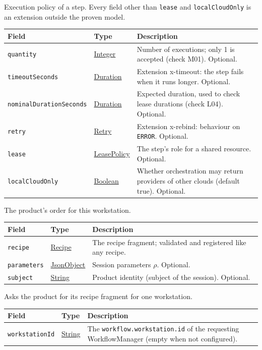 \documentclass[a4paper]{arrowhead}
\newcommand{\mref}[1]{{\textcolor{ArrowheadPurple}{\hyperref[sec:model:#1]{#1}}}}
\newcommand{\pref}[1]{{\textcolor{ArrowheadGrey}{\hyperref[sec:model:primitives:#1]{#1}}}}
\begin{document}
Execution policy of a step. Every field other than \texttt{lease} and \texttt{localCloudOnly} is an extension outside the proven model.

{\small
\begin{longtable}{|p{3.9cm}|p{4.4cm}|p{7.5cm}|}

\hline
\rowcolor{gray!33} Field & Type & Description \\ \hline
\endhead
\texttt{quantity} & \pref{Integer} & Number of executions; only 1 is accepted (check M01). Optional. \\ \hline
\texttt{timeoutSeconds} & \pref{Duration} & Extension x-timeout: the step fails when it runs longer. Optional. \\ \hline
\texttt{nominalDurationSeconds} & \pref{Duration} & Expected duration, used to check lease durations (check L04). Optional. \\ \hline
\texttt{retry} & \mref{Retry} & Extension x-rebind: behaviour on \texttt{ERROR}. Optional. \\ \hline
\texttt{lease} & \mref{LeasePolicy} & The step's role for a shared resource. Optional. \\ \hline
\texttt{localCloudOnly} & \pref{Boolean} & Whether orchestration may return providers of other clouds (default true). Optional. \\ \hline
\end{longtable}
}

The product's order for this workstation.

{\small
\begin{longtable}{|p{3.9cm}|p{4.4cm}|p{7.5cm}|}

\hline
\rowcolor{gray!33} Field & Type & Description \\ \hline
\endhead
\texttt{recipe} & \mref{Recipe} & The recipe fragment; validated and registered like any recipe. \\ \hline
\texttt{parameters} & \pref{JsonObject} & Session parameters $\rho$. Optional. \\ \hline
\texttt{subject} & \pref{String} & Product identity (subject of the session). Optional. \\ \hline
\end{longtable}
}

Asks the product for its recipe fragment for one workstation.

{\small
\begin{longtable}{|p{3.9cm}|p{4.4cm}|p{7.5cm}|}

\hline
\rowcolor{gray!33} Field & Type & Description \\ \hline
\endhead
\texttt{workstationId} & \pref{String} & The \texttt{workflow.workstation.id} of the requesting WorkflowManager (empty when not configured). \\ \hline
\end{longtable}
}
\end{document}
